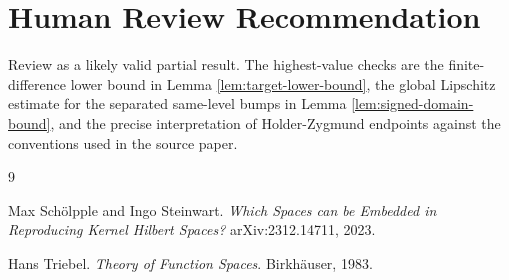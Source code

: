 \documentclass[11pt]{article}
\begin{document}
\section*{Human Review Recommendation}

Review as a likely valid partial result. The highest-value checks are the
finite-difference lower bound in Lemma \ref{lem:target-lower-bound}, the
global Lipschitz estimate for the separated same-level bumps in Lemma
\ref{lem:signed-domain-bound}, and the precise interpretation of
Holder-Zygmund endpoints against the conventions used in the source paper.

\begin{thebibliography}{9}

Max Sch\"olpple and Ingo Steinwart.
\newblock \emph{Which Spaces can be Embedded in Reproducing Kernel Hilbert Spaces?}
\newblock arXiv:2312.14711, 2023.

Hans Triebel.
\newblock \emph{Theory of Function Spaces}.
\newblock Birkh\"auser, 1983.

\end{thebibliography}
\end{document}
